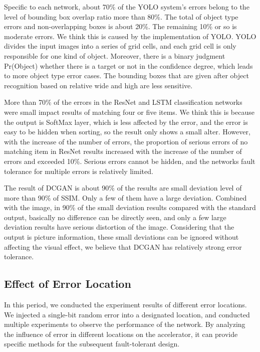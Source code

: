 Specific to each network, about 70\% of the YOLO system's errors belong to the level of bounding box overlap ratio more than 80\%. The total of object type errors and non-overlapping boxes is about 20\%. The remaining 10\% or so is moderate errors. We think this is caused by the implementation of YOLO. YOLO divides the input images into a series of grid cells, and each grid cell is only responsible for one kind of object. Moreover, there is a binary judgment Pr(Object) whether there is a target or not in the confidence degree, which leads to more object type error cases. The bounding boxes that are given after object recognition based on relative wide and high are less sensitive.

More than 70\% of the errors in the ResNet and LSTM classification networks were small impact results of matching four or five items. We think this is because the output is SoftMax layer, which is less affected by the error, and the error is easy to be hidden when sorting, so the result only shows a small alter. However, with the increase of the number of errors, the proportion of serious errors of no matching item in ResNet results increased with the increase of the number of errors and exceeded 10\%. Serious errors cannot be hidden, and the networks fault tolerance for multiple errors is relatively limited.

The result of DCGAN is about 90\% of the results are small deviation level of more than 90\% of SSIM. Only a few of them have a large deviation. Combined with the image, in 90\% of the small deviation results compared with the standard output, basically no difference can be directly seen, and only a few large deviation results have serious distortion of the image. Considering that the output is picture information, these small deviations can be ignored without affecting the visual effect, we believe that DCGAN has relatively strong error tolerance.


\subsection{Effect of Error Location}
In this period, we conducted the experiment results of different error locations. We injected a single-bit random error into a designated location, and conducted multiple experiments to observe the performance of the network. By analyzing the influence of error in different locations on the accelerator, it can provide specific methods for the subsequent fault-tolerant design.

